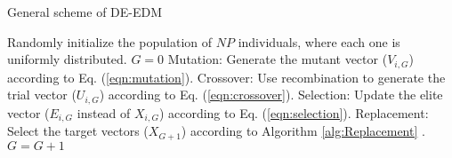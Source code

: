 \begin{algorithm}[t]
  \scriptsize
	\caption{General scheme of DE-EDM} 
	\begin{algorithmic}[1]
	\STATE Randomly initialize the population of $NP$ individuals, where each one is uniformly distributed.
	\STATE $G=0$
		\STATE Mutation: Generate the mutant vector ($V_{i,G}$) according to Eq. (\ref{eqn:mutation}).
		\STATE Crossover: Use recombination to generate the trial vector ($U_{i,G}$) according to Eq. (\ref{eqn:crossover}).
		\STATE Selection: Update the elite vector ($E_{i,G}$ instead of $X_{i,G}$) according to Eq. (\ref{eqn:selection}).
	   \ENDFOR
		\STATE Replacement: Select the target vectors ($X_{G+1}$) according to Algorithm \ref{alg:Replacement} .
	   \STATE $G=G+1$
	\ENDWHILE
\end{algorithmic}
    \label{alg:DEEDM}
\end{algorithm}

%
%
%
%
%
%
%
%
%

